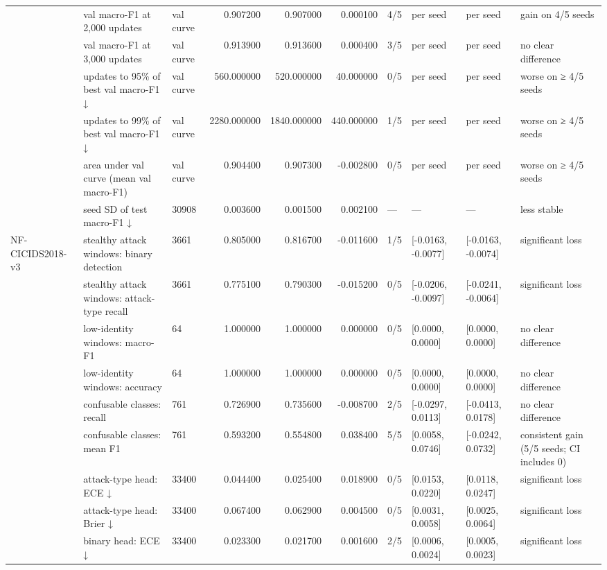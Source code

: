 \begin{table}
\begin{tabular}{lllrrrllll}
 & val macro-F1 at 2,000 updates & val curve & 0.907200 & 0.907000 & 0.000100 & 4/5 & per seed & per seed & gain on 4/5 seeds \\
 & val macro-F1 at 3,000 updates & val curve & 0.913900 & 0.913600 & 0.000400 & 3/5 & per seed & per seed & no clear difference \\
 & updates to 95\% of best val macro-F1 ↓ & val curve & 560.000000 & 520.000000 & 40.000000 & 0/5 & per seed & per seed & worse on ≥ 4/5 seeds \\
 & updates to 99\% of best val macro-F1 ↓ & val curve & 2280.000000 & 1840.000000 & 440.000000 & 1/5 & per seed & per seed & worse on ≥ 4/5 seeds \\
 & area under val curve (mean val macro-F1) & val curve & 0.904400 & 0.907300 & -0.002800 & 0/5 & per seed & per seed & worse on ≥ 4/5 seeds \\
 & seed SD of test macro-F1 ↓ & 30908 & 0.003600 & 0.001500 & 0.002100 & — & — & — & less stable \\
\cline{1-10}
\multirow[t]{17}{*}{NF-CICIDS2018-v3} & stealthy attack windows: binary detection & 3661 & 0.805000 & 0.816700 & -0.011600 & 1/5 & [-0.0163, -0.0077] & [-0.0163, -0.0074] & significant loss \\
 & stealthy attack windows: attack-type recall & 3661 & 0.775100 & 0.790300 & -0.015200 & 0/5 & [-0.0206, -0.0097] & [-0.0241, -0.0064] & significant loss \\
 & low-identity windows: macro-F1 & 64 & 1.000000 & 1.000000 & 0.000000 & 0/5 & [0.0000, 0.0000] & [0.0000, 0.0000] & no clear difference \\
 & low-identity windows: accuracy & 64 & 1.000000 & 1.000000 & 0.000000 & 0/5 & [0.0000, 0.0000] & [0.0000, 0.0000] & no clear difference \\
 & confusable classes: recall & 761 & 0.726900 & 0.735600 & -0.008700 & 2/5 & [-0.0297, 0.0113] & [-0.0413, 0.0178] & no clear difference \\
 & confusable classes: mean F1 & 761 & 0.593200 & 0.554800 & 0.038400 & 5/5 & [0.0058, 0.0746] & [-0.0242, 0.0732] & consistent gain (5/5 seeds; CI includes 0) \\
 & attack-type head: ECE ↓ & 33400 & 0.044400 & 0.025400 & 0.018900 & 0/5 & [0.0153, 0.0220] & [0.0118, 0.0247] & significant loss \\
 & attack-type head: Brier ↓ & 33400 & 0.067400 & 0.062900 & 0.004500 & 0/5 & [0.0031, 0.0058] & [0.0025, 0.0064] & significant loss \\
 & binary head: ECE ↓ & 33400 & 0.023300 & 0.021700 & 0.001600 & 2/5 & [0.0006, 0.0024] & [0.0005, 0.0023] & significant loss \\

\end{tabular}
\end{table}
